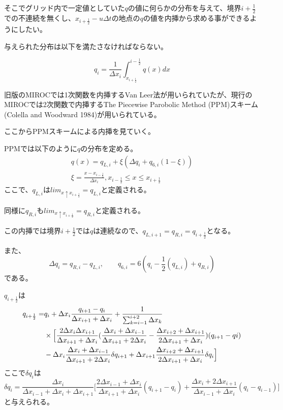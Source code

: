 \documentclass{jsbook}
\begin{document}
そこでグリッド内で一定値としていた$q$の値に何らかの分布を与えて、境界$i+\frac{1}{2}$での不連続を無くし、$x_{i+\frac{1}{2}}-u\Delta t$の地点の$q$の値を内挿から求める事ができるようにしたい。

与えられた分布は以下を満たさなければならない。

\begin{equation}
  q_{i}=\frac{1}{\Delta x_{i}} \int_{x_{i+\frac{1}{2}}}^{i-\frac{1}{2}} q(x) dx
\end{equation}

旧版のMIROCでは1次関数を内挿するVan Leer法が用いられていたが、現行のMIROCでは2次関数で内挿するThe Piecewise Parobolic Method (PPM)スキーム(Colella and Woodward 1984)が用いられている。

ここからPPMスキームによる内挿を見ていく。

PPMでは以下のように$q$の分布を定める。
\begin{equation}
\begin{split}
\label{a4}
  q(x)=q_{L,i}+\xi (\Delta q_{i}+q_{6,i}(1-\xi)) \\
  \xi=\frac{x-x_{i-\frac{1}{2}}}{\Delta x_{i}},  x_{i-\frac{1}{2}}\leq x \leq x_{i+\frac{1}{2}}
  \end{split}
\end{equation}
ここで、$q_{L,i}$は$lim_{x \uparrow x_{i+\frac{1}{2}}}=q_{L,i}$と定義される。

同様に$q_{R,i}$も$lim_{x \uparrow x_{i+\frac{1}{2}}}=q_{R,i}$と定義される。

この内挿では境界$i+\frac{1}{2}$では$q$は連続なので、$q_{L,i+1}=q_{R,i}=q_{i+\frac{1}{2}}$となる。

また、
\begin{equation}
  \Delta q_{i}=q_{R,i}-q_{L,i},\qquad q_{6,i}=6(q_{i}-\frac{1}{2}(q_{L,i})+q_{R,i})
\end{equation}
である。

$q_{i+\frac{1}{2}}$は
\begin{equation}
  \label{a3}
  \begin{split}
    q_{i+\frac{1}{2}}=&q_{i}+\Delta x_{i} \frac{q_{i+1}-q_{i}}{\Delta x_{i+1}+\Delta x_{i}}+\frac{1}{\sum_{k=i-1}^{i+2}\Delta x_{k}}\\
    &\times \Bigl[\frac{2\Delta x_{i}\Delta x_{i+1}}{\Delta x_{i+1}+\Delta x_{i}}(\frac{\Delta x_{i}+\Delta x_{i-1}}{\Delta x_{i+1}+2\Delta x_{i}}-\frac{\Delta x_{i+2}+\Delta x_{i+1}}{2\Delta x_{i+1}+\Delta x_{i}})(q_{i+1}-q{i})\\
     & -\Delta x_{i}\frac{\Delta x_{i}+\Delta x_{i-1}}{\Delta x_{i+1}+2\Delta x_{i}} \delta q_{i+1}+\Delta x_{i+1} \frac{\Delta x_{i+2}+\Delta x_{i+1}}{2\Delta x_{i+1}+\Delta x_{i}} \delta q_{i}\Bigr]
  \end{split}
\end{equation}
ここで$\delta q_{i}$は
\begin{equation}
  \delta q_{i}=\frac{\Delta x_{i}}{\Delta x_{i-1}+\Delta x_{i}+\Delta x_{i+1}}\biggl[\frac{2\Delta x_{i-1}+\Delta x_{i}}{\Delta x_{i+1}+\Delta x_{i}}(q_{i+1}-q_{i})+\frac{\Delta x_{i}+2\Delta x_{i+1}}{\Delta x_{i-1}+\Delta x_{i}}(q_{i}-q_{i-1})\biggr]
\end{equation}
と与えられる。
\end{document}
